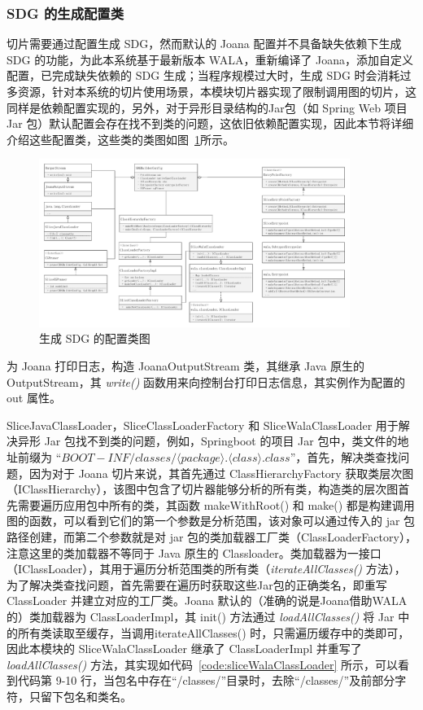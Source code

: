 \subsubsection{SDG 的生成配置类}
切片需要通过配置生成 SDG，然而默认的 Joana 配置并不具备缺失依赖下生成 SDG 的功能，为此本系统基于最新版本 WALA，重新编译了 Joana，添加自定义配置，已完成缺失依赖的 SDG 生成；当程序规模过大时，生成 SDG 时会消耗过多资源，针对本系统的切片使用场景，本模块切片器实现了限制调用图的切片，这同样是依赖配置实现的，另外，对于异形目录结构的Jar包（如 Spring Web 项目 Jar 包）默认配置会存在找不到类的问题，这依旧依赖配置实现，因此本节将详细介绍这些配置类，这些类的类图如图~\ref{JoanaConfig}所示。

\begin{figure}[!htb]
    \centering
    \includegraphics[width=0.9\textwidth]{FIGs/chapter4/sliceConfigClass.pdf}
    \caption{生成 SDG 的配置类图}\label{JoanaConfig}
\end{figure}

为 Joana 打印日志，构造 JoanaOutputStream 类，其继承 Java 原生的 OutputStream，其 \textit{write()} 函数用来向控制台打印日志信息，其实例作为配置的 out 属性。

SliceJavaClassLoader，SliceClassLoaderFactory 和 SliceWalaClassLoader 用于解决异形 Jar 包找不到类的问题，例如，Springboot 的项目 Jar 包中，类文件的地址前缀为 “$BOOT-INF/classes/\langle package \rangle.\langle class \rangle.class $”，首先，解决类查找问题，因为对于 Joana 切片来说，其首先通过 ClassHierarchyFactory 获取类层次图（IClassHierarchy），该图中包含了切片器能够分析的所有类，构造类的层次图首先需要遍历应用包中所有的类，其函数 makeWithRoot() 和 make() 都是构建调用图的函数，可以看到它们的第一个参数是分析范围，该对象可以通过传入的 jar 包路径创建，而第二个参数就是对 jar 包的类加载器工厂类（ClassLoaderFactory），注意这里的类加载器不等同于 Java 原生的 Classloader。类加载器为一接口（IClassLoader），其用于遍历分析范围类的所有类（\textit{iterateAllClasses()} 方法），为了解决类查找问题，首先需要在遍历时获取这些Jar包的正确类名，即重写 ClassLoader 并建立对应的工厂类。Joana 默认的（准确的说是Joana借助WALA的）类加载器为 ClassLoaderImpl，其 init() 方法通过 \textit{loadAllClasses()} 将 Jar 中的所有类读取至缓存，当调用iterateAllClasses() 时，只需遍历缓存中的类即可，因此本模块的 SliceWalaClassLoader 继承了 ClassLoaderImpl 并重写了 \textit{loadAllClasses()} 方法，其实现如代码~\ref{code:sliceWalaClassLoader} 所示，可以看到代码第 9-10 行，当包名中存在“/classes/”目录时，去除“/classes/”及前部分字符，只留下包名和类名。

